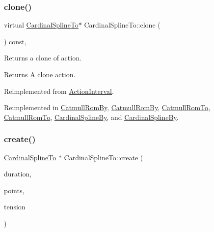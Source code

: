 \mbox{\label{classCardinalSplineTo_a2203360a7f12e0223870dc8574cbe084}} 
\subsubsection{\texorpdfstring{clone()}{clone()}\hspace{0.1cm}{\footnotesize\ttfamily [2/2]}}
{\footnotesize\ttfamily virtual \hyperlink{classCardinalSplineTo}{Cardinal\+Spline\+To}$\ast$ Cardinal\+Spline\+To\+::clone (\begin{DoxyParamCaption}\item[{void}]{ }\end{DoxyParamCaption}) const\hspace{0.3cm}{\ttfamily [override]}, {\ttfamily [virtual]}}

Returns a clone of action.

\begin{DoxyReturn}{Returns}
A clone action. 
\end{DoxyReturn}


Reimplemented from \hyperlink{classActionInterval_abc93ce0c2f54a90eb216a7803f25f44a}{Action\+Interval}.



Reimplemented in \hyperlink{classCatmullRomBy_aea28e624bd562521e444af38384470aa}{Catmull\+Rom\+By}, \hyperlink{classCatmullRomBy_a972f2e516b44eaa141ae270f575024e5}{Catmull\+Rom\+By}, \hyperlink{classCatmullRomTo_afa8df104554278343334dfa497cc1526}{Catmull\+Rom\+To}, \hyperlink{classCatmullRomTo_ac06c19763c7b07903f19178f94694541}{Catmull\+Rom\+To}, \hyperlink{classCardinalSplineBy_abe6e897500669708f01d42fd97226a02}{Cardinal\+Spline\+By}, and \hyperlink{classCardinalSplineBy_a35b00381b2823644533fd485817b147e}{Cardinal\+Spline\+By}.

\mbox{\label{classCardinalSplineTo_a49dcc4667a5af6476e9b10792735033c}} 
\subsubsection{\texorpdfstring{create()}{create()}\hspace{0.1cm}{\footnotesize\ttfamily [1/2]}}
{\footnotesize\ttfamily \hyperlink{classCardinalSplineTo}{Cardinal\+Spline\+To} $\ast$ Cardinal\+Spline\+To\+::create (\begin{DoxyParamCaption}\item[{float}]{duration,  }\item[{\hyperlink{classPointArray}{Point\+Array} $\ast$}]{points,  }\item[{float}]{tension }\end{DoxyParamCaption})\hspace{0.3cm}{\ttfamily [static]}}

